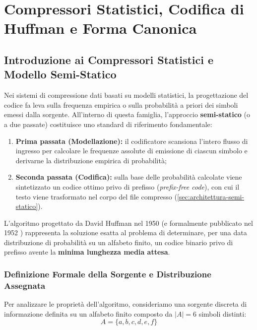 \chapter{Compressori Statistici, Codifica di Huffman e Forma Canonica}
\label{ch:compressori-statistici-huffman-canonica}

\section{Introduzione ai Compressori Statistici e Modello Semi-Statico}
\label{sec:intro-compressori-statistici}

Nei sistemi di compressione dati basati su modelli statistici, la progettazione del codice fa leva sulla frequenza empirica o sulla probabilit\`a a priori dei simboli emessi dalla sorgente. All'interno di questa famiglia, l'approccio \textbf{semi-statico} (o a due passate) costituisce uno standard di riferimento fondamentale:
\begin{enumerate}
  \item \textbf{Prima passata (Modellazione):} il codificatore scansiona l'intero flusso di ingresso per calcolare le frequenze assolute di emissione di ciascun simbolo e derivarne la distribuzione empirica di probabilit\`a;
  \item \textbf{Seconda passata (Codifica):} sulla base delle probabilit\`a calcolate viene sintetizzato un codice ottimo privo di prefisso (\textit{prefix-free code}), con cui il testo viene trasformato nel corpo del file compresso (\autoref{sec:architettura-semi-statico}).
\end{enumerate}

L'algoritmo progettato da David Huffman nel 1950 (e formalmente pubblicato nel 1952 \cite{huffman1952}) rappresenta la soluzione esatta al problema di determinare, per una data distribuzione di probabilit\`a su un alfabeto finito, un codice binario privo di prefisso avente la \textbf{minima lunghezza media attesa}.

\FloatBarrier
\subsection{Definizione Formale della Sorgente e Distribuzione Assegnata}
\label{subsec:modello-sorgente-huffman}

Per analizzare le propriet\`a dell'algoritmo, consideriamo una sorgente discreta di informazione definita su un alfabeto finito composto da $\vert A \vert = 6$ simboli distinti:
\begin{equation}
  A = \{a, b, c, d, e, f\}
\end{equation}

